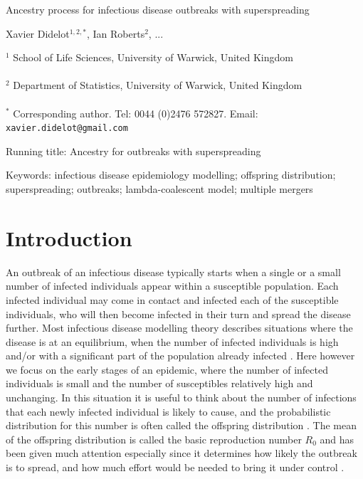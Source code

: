 \documentclass{article}
\begin{document}
{\Large Ancestry process for infectious disease outbreaks with superspreading}


\vspace*{2cm}
Xavier Didelot$^{1,2,*}$, Ian Roberts$^{2}$, ...

\vspace*{2cm}
$^1$ School of Life Sciences, University of Warwick, United Kingdom\\\\
$^2$ Department of Statistics, University of Warwick, United Kingdom\\\\
$^*$ Corresponding author. Tel: 0044 (0)2476 572827. Email: \verb+xavier.didelot@gmail.com+

\vspace*{2cm}
Running title: Ancestry for outbreaks with superspreading

\vspace*{2cm}
Keywords: infectious disease epidemiology modelling; offspring distribution; superspreading; outbreaks; lambda-coalescent model; multiple mergers


\newpage
\section{Introduction}

An outbreak of an infectious disease typically starts when a single or a small number
of infected individuals appear within a susceptible population. Each infected individual
may come in contact and infected each of the susceptible individuals, who will then
become infected in their turn and spread the disease further. Most infectious disease
modelling theory describes situations where the disease is at an equilibrium, when the number
of infected individuals is high and/or with a significant part of the population already infected
\citep{Anderson1991,keeling2008modeling}. 
Here however we focus on the early stages of an epidemic, where the number of 
infected individuals is small and the number of susceptibles relatively high and unchanging.
In this situation it is useful to think about the number of infections that each newly infected
individual is likely to cause, and the probabilistic distribution for this number is often called
the offspring distribution \citep{Grassly2008}. 
The mean of the offspring distribution is called the basic
reproduction number $R_0$ and has been given much attention especially since
it determines how likely the outbreak is to spread, and how much effort would be needed
to bring it under control \citep{fraserFactorsThatMake2004}. 
\end{document}
